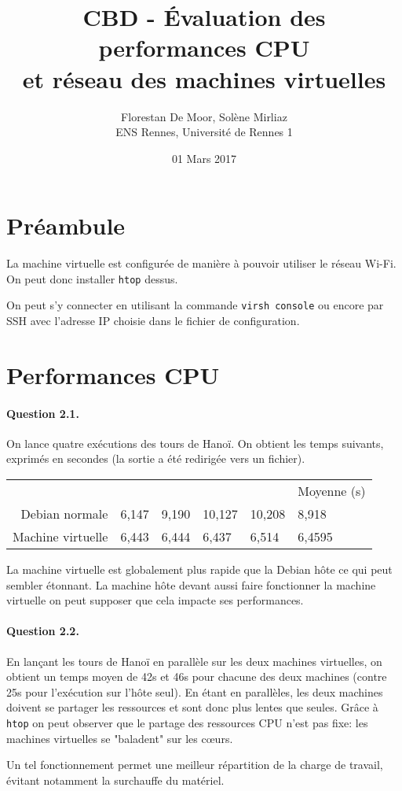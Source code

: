 \documentclass[a4paper]{article}
\begin{document}
\title{CBD - Évaluation des performances CPU\\ et réseau des machines virtuelles}
\author{Florestan De Moor, Solène Mirliaz\\ ENS Rennes, Université de Rennes 1}
\date{01 Mars 2017}

\maketitle

\section{Préambule}

La machine virtuelle est configurée de manière à pouvoir utiliser le réseau Wi-Fi.
On peut donc installer \texttt{htop} dessus.

On peut s'y connecter en utilisant la commande \texttt{virsh console} ou encore par SSH avec l'adresse IP choisie dans le fichier de configuration.

\section{Performances CPU}

\paragraph{Question 2.1.} On lance quatre exécutions des tours de Hanoï. On obtient les temps suivants, exprimés en secondes (la sortie a été redirigée vers un fichier).
\begin{center}
\begin{tabular}{r|l l l l|l}
\multicolumn{5}{c|}{}&Moyenne (s) \\
Debian normale & 6,147 & 9,190 & 10,127 & 10,208 & 8,918 \\
Machine virtuelle & 6,443 & 6,444 & 6,437 & 6,514 & 6,4595
\end{tabular}
\end{center}
La machine virtuelle est globalement plus rapide que la Debian hôte ce qui peut sembler étonnant. La machine hôte devant aussi faire fonctionner la machine virtuelle on peut supposer que cela impacte ses performances.

\paragraph{Question 2.2.} En lançant les tours de Hanoï en parallèle sur les deux machines virtuelles, on obtient un temps moyen de 42s et 46s pour chacune des deux machines (contre 25s pour l'exécution sur l'hôte seul). En étant en parallèles, les deux machines doivent se partager les ressources et sont donc plus lentes que seules. Grâce à \texttt{htop} on peut observer que le partage des ressources CPU n'est pas fixe: les machines virtuelles se "baladent" sur les cœurs.
\par Un tel fonctionnement permet une meilleur répartition de la charge de travail, évitant notamment la surchauffe du matériel.
\end{document}
